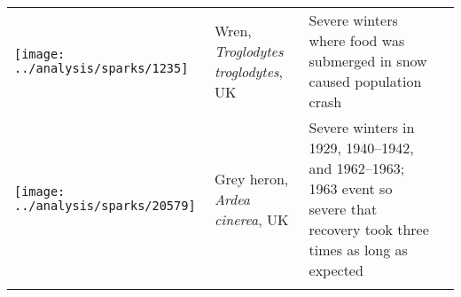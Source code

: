 \begin{small}
\begin{longtable}{>{\RaggedRight}m{2.0cm}>{\RaggedRight}p{3.0cm}>{\RaggedRight}p{7.0cm}>{\RaggedRight}p{2.0cm}}
\texttt{[image: ../analysis/sparks/1235]} &
Wren,
\textit{Troglodytes troglodytes},
UK &
Severe winters where food was submerged in snow caused population crash &
\citep{newton1998} \\

\texttt{[image: ../analysis/sparks/20579]} &
Grey heron,
\textit{Ardea cinerea},
UK &
Severe winters in 1929, 1940--1942, and 1962--1963; 1963 event so severe that
recovery took three times as long as expected &
\citep{stafford1971} \\





\bottomrule
\label{tab:sparks}
\end{longtable}
\end{small}

